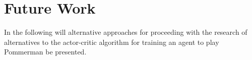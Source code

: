 \section{Future Work}
\label{sec:futurework}
In the following will alternative approaches for proceeding with the research of alternatives to the actor-critic algorithm for training an agent to play Pommerman be presented.

